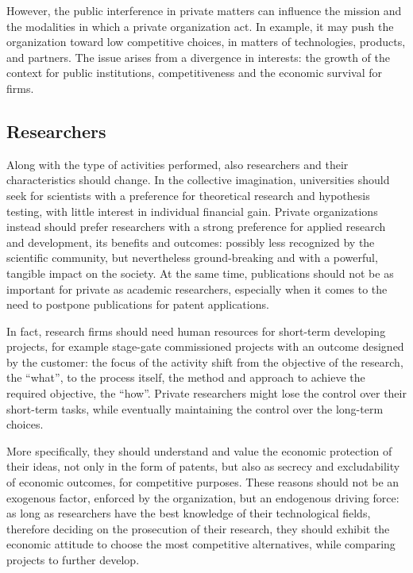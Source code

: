 However, the public interference in private matters can influence the mission and the modalities in which a private organization act. In example, it may push the organization toward low competitive choices, in matters of technologies, products, and partners. The issue arises from a divergence in interests: the growth of the context for public institutions, competitiveness and the economic survival for firms.  

\subsection{Researchers}

Along with the type of activities performed, also researchers and their characteristics should change. In the collective imagination, universities should seek for scientists with a preference for theoretical research and hypothesis testing, with little interest in individual financial gain. Private organizations instead should prefer researchers with a strong preference for applied research and development, its benefits and outcomes: possibly less recognized by the scientific community, but nevertheless ground-breaking and with a powerful, tangible impact on the society. At the same time, publications should not be as important for private as academic researchers, especially when it comes to the need to postpone publications for patent applications.  

In fact, research firms should need human resources for short-term developing projects, for example stage-gate commissioned projects with an outcome designed by the customer: the focus of the activity shift from the objective of the research, the \enquote{what}, to the process itself, the method and approach to achieve the required objective, the \enquote{how}. Private researchers might lose the control over their short-term tasks, while eventually maintaining the control over the long-term choices.

More specifically, they should understand and value the economic protection of their ideas, not only in the form of patents, but also as secrecy and excludability of economic outcomes, for competitive purposes. These reasons should not be an exogenous factor, enforced by the organization, but an endogenous driving force: as long as researchers have the best knowledge of their technological fields, therefore deciding on the prosecution of their research, they should exhibit the economic attitude to choose the most competitive alternatives, while comparing projects to further develop.

